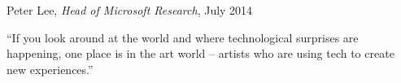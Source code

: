 
\vspace*{7cm}
\begin{chapquote}{Peter Lee, \textit{Head of Microsoft Research}, July 2014}
\begin{center}
``If you look around at the world and where technological surprises are happening, one place is in the art world -- artists who are using tech to create new experiences.''
\end{center}
\end{chapquote}

